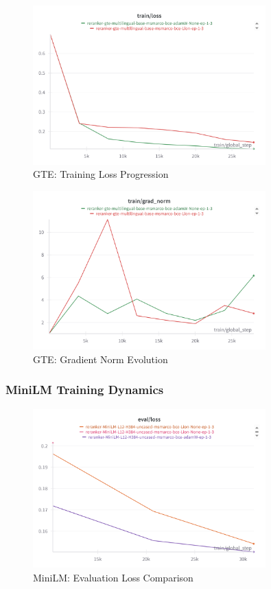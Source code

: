 \begin{figure}[htbp]
    \centering
    \includegraphics[width=0.8\textwidth]{Figures/gte_adamW_v_lion_train_loss.png}
    \caption{GTE: Training Loss Progression}
    \label{fig:gte_train_loss}
\end{figure}

\begin{figure}[htbp]
    \centering
    \includegraphics[width=0.8\textwidth]{Figures/gte_adamW_v_lion_grad_norm.png}
    \caption{GTE: Gradient Norm Evolution}
    \label{fig:gte_grad_norm}
\end{figure}

\subsubsection{MiniLM Training Dynamics}

\begin{figure}[htbp]
    \centering
    \includegraphics[width=0.8\textwidth]{Figures/microsoft_MiniLM-L12-H384-uncased_adamW_v_Lion_eval_loss.png}
    \caption{MiniLM: Evaluation Loss Comparison}
    \label{fig:minilm_eval_loss}
\end{figure}

